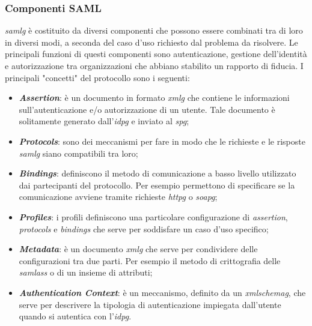 \subsubsection{Componenti SAML}
\textit{\gls{samlg}} è costituito da diversi componenti che possono essere combinati tra di loro in diversi modi, a seconda del caso d'uso richiesto dal problema da risolvere. Le principali funzioni di questi componenti sono autenticazione, gestione dell'identità e autorizzazione tra organizzazioni che abbiano stabilito un rapporto di fiducia. I principali "concetti" del protocollo sono i seguenti:
\begin{itemize}
    \item \textit{\textbf{Assertion}}: è un documento in formato \textit{\gls{xmlg}} che contiene le informazioni sull'autenticazione e/o autorizzazione di un utente. Tale documento è solitamente generato dall'\textit{\gls{idpg}} e inviato al \textit{\gls{spg}};
    \item \textit{\textbf{Protocols}}: sono dei meccanismi per fare in modo che le richieste e le risposte \textit{\gls{samlg}} siano compatibili tra loro;
    \item \textit{\textbf{Bindings}}: definiscono il metodo di comunicazione a basso livello utilizzato dai partecipanti del protocollo. Per esempio permettono di specificare se la comunicazione avviene tramite richieste \textit{\gls{httpg}} o \textit{\gls{soapg}};
    \item \textit{\textbf{Profiles}}: i profili definiscono una particolare configurazione di \textit{assertion}, \textit{protocols} e \textit{bindings} che serve per soddisfare un caso d'uso specifico;
    \item \textit{\textbf{Metadata}}: è un documento \textit{\gls{xmlg}} che serve per condividere delle configurazioni tra due parti. Per esempio il metodo di crittografia delle \textit{\gls{samlass}} o di un insieme di attributi;
    \item \textit{\textbf{Authentication Context}}: è un meccanismo, definito da un \textit{\gls{xmlschemag}}, che serve per descrivere la tipologia di autenticazione impiegata dall'utente quando si autentica con l'\textit{\gls{idpg}}.
\end{itemize}

\newpage

